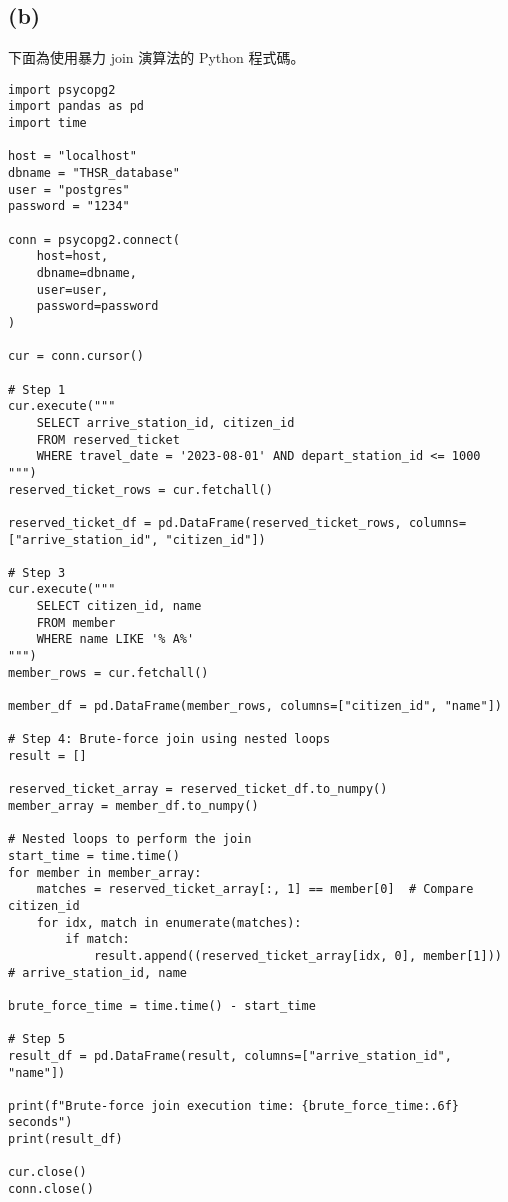 \documentclass{article}
\begin{document}
\subsection*{(b)}
下面為使用暴力 join 演算法的 Python 程式碼。
\begin{verbatim}
import psycopg2
import pandas as pd
import time

host = "localhost"
dbname = "THSR_database"
user = "postgres"
password = "1234"

conn = psycopg2.connect(
    host=host,
    dbname=dbname,
    user=user,
    password=password
)

cur = conn.cursor()

# Step 1
cur.execute("""
    SELECT arrive_station_id, citizen_id
    FROM reserved_ticket
    WHERE travel_date = '2023-08-01' AND depart_station_id <= 1000
""")
reserved_ticket_rows = cur.fetchall()

reserved_ticket_df = pd.DataFrame(reserved_ticket_rows, columns=["arrive_station_id", "citizen_id"])

# Step 3
cur.execute("""
    SELECT citizen_id, name
    FROM member
    WHERE name LIKE '% A%'
""")
member_rows = cur.fetchall()

member_df = pd.DataFrame(member_rows, columns=["citizen_id", "name"])

# Step 4: Brute-force join using nested loops
result = []

reserved_ticket_array = reserved_ticket_df.to_numpy()
member_array = member_df.to_numpy()

# Nested loops to perform the join
start_time = time.time()
for member in member_array:
    matches = reserved_ticket_array[:, 1] == member[0]  # Compare citizen_id
    for idx, match in enumerate(matches):
        if match:
            result.append((reserved_ticket_array[idx, 0], member[1]))  # arrive_station_id, name

brute_force_time = time.time() - start_time

# Step 5
result_df = pd.DataFrame(result, columns=["arrive_station_id", "name"])

print(f"Brute-force join execution time: {brute_force_time:.6f} seconds")
print(result_df)

cur.close()
conn.close()
\end{verbatim}
\end{document}
